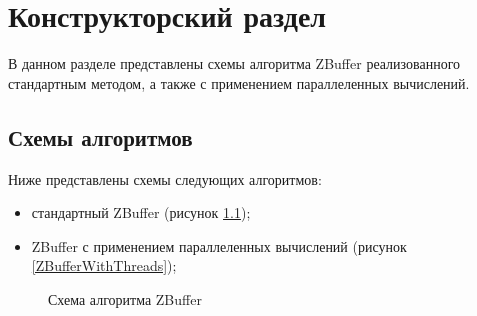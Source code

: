 \chapter{Конструкторский раздел}
В данном разделе представлены схемы алгоритма ZBuffer реализованного стандартным методом, а также с применением параллеленных вычислений.


\section{Схемы алгоритмов}
Ниже представлены схемы следующих алгоритмов:
\begin{itemize}
	\item стандартный ZBuffer (рисунок \ref{ZBufferAlg});
	\item ZBuffer с применением параллеленных вычислений (рисунок \ref{ZBufferWithThreads});
\end{itemize}

\begin{figure}
	\caption{Схема алгоритма ZBuffer}
	\label{ZBufferAlg}
\end{figure}


